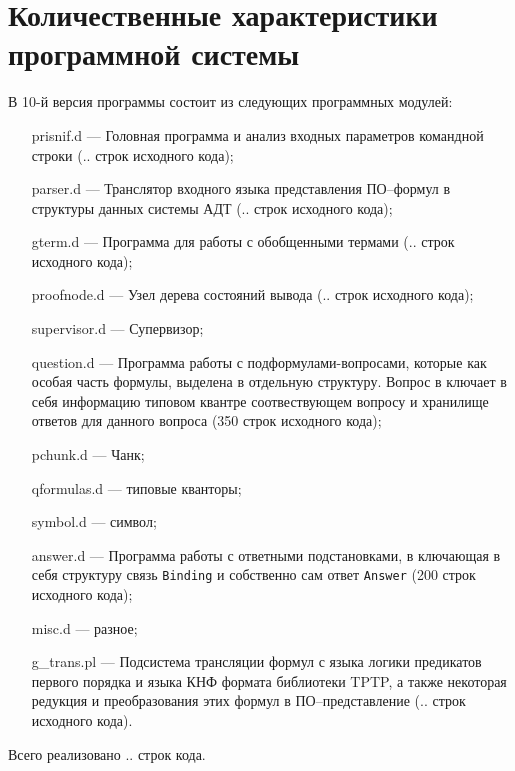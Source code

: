 \section{Количественные характеристики программной системы}
В 10-й версия программы состоит из следующих программных модулей:
\begin{enumerate}
\item[prisnif.d] --- Головная программа и анализ входных параметров командной строки (.. строк исходного кода);
\item[parser.d] --- Транслятор входного языка представления ПО--формул в структуры данных системы АДТ (.. строк исходного кода);
\item[gterm.d] --- Программа для работы с обобщенными термами (.. строк исходного кода);
\item[proofnode.d] --- Узел дерева состояний вывода (.. строк исходного кода);
\item[supervisor.d] --- Супервизор;
\item[question.d] --- Программа работы с подформулами-вопросами, которые как особая часть формулы, выделена в отдельную структуру. Вопрос в ключает в себя информацию типовом квантре соотвествующем вопросу и хранилище ответов для данного вопроса (350 строк исходного кода);
\item[pchunk.d] --- Чанк;
\item[qformulas.d] --- типовые кванторы;
\item[symbol.d] --- символ;
\item[answer.d] --- Программа работы с ответными подстановками, в ключающая в себя структуру связь \texttt{Binding} и собственно сам ответ \texttt{Answer} (200 строк исходного кода);
\item[misc.d] --- разное;
\item[g\_trans.pl] --- Подсистема трансляции формул с языка логики предикатов первого порядка и языка КНФ формата библиотеки TPTP, а также некоторая редукция и преобразования этих формул в ПО--представление (.. строк исходного кода).
\end{enumerate}
Всего реализовано .. строк кода.

